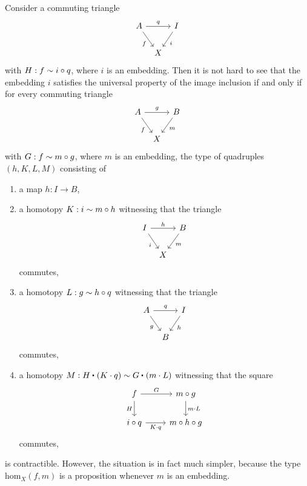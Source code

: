 \begin{rmk}
  Consider a commuting triangle
\begin{equation*}
\begin{tikzcd}[column sep=tiny]
A \arrow[rr,"q"] \arrow[dr,swap,"f"] & & I \arrow[dl,"i"] \\
& X
\end{tikzcd}
\end{equation*}
with $H:f\sim i\circ q$, where $i$ is an embedding. Then it is not hard to see that the embedding $i$ satisfies the universal property of the image inclusion if and only if for every commuting triangle
\begin{equation*}
  \begin{tikzcd}[column sep=tiny]
    A \arrow[dr,swap,"f"] \arrow[rr,"g"] & & B \arrow[dl,"m"] \\
    & X
  \end{tikzcd}
\end{equation*}
with $G:f\sim m\circ g$, where $m$ is an embedding, the type of quadruples $(h,K,L,M)$ consisting of
\begin{enumerate}
\item a map $h:I\to B$,
\item a homotopy $K:i\sim m\circ h$ witnessing that the triangle
  \begin{equation*}
    \begin{tikzcd}[column sep=tiny]
      I \arrow[rr,"h"] \arrow[dr,swap,"i"] & & B \arrow[dl,"m"] \\
      & X
    \end{tikzcd}
  \end{equation*}
  commutes,
\item a homotopy $L:g\sim h\circ q$ witnessing that the triangle
  \begin{equation*}
    \begin{tikzcd}[column sep=tiny]
      A \arrow[rr,"q"] \arrow[dr,swap,"g"] & & I \arrow[dl,"h"] \\
      & B
    \end{tikzcd}
  \end{equation*}
  commutes,
\item a homotopy $M:\ct{H}{(K\cdot q)}\htpy\ct{G}{(m\cdot L)}$ witnessing that the square
  \begin{equation*}
    \begin{tikzcd}
      f \arrow[d,swap,"H"] \arrow[r,"G"] & m\circ g \arrow[d,"m\cdot L"] \\
      i\circ q \arrow[r,swap,"K\cdot q"] & m\circ h\circ g
    \end{tikzcd}
  \end{equation*}
  commutes,
\end{enumerate}
is contractible. However, the situation is in fact much simpler, because the type $\mathrm{hom}_X(f,m)$ is a proposition whenever $m$ is an embedding.
\end{rmk}

